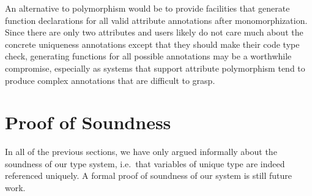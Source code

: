 An alternative to polymorphism would be to provide facilities that generate function declarations for all valid attribute annotations after monomorphization. Since there are only two attributes and users likely do not care much about the concrete uniqueness annotations except that they should make their code type check, generating functions for all possible annotations may be a worthwhile compromise, especially as systems that support attribute polymorphism tend to produce complex annotations that are difficult to grasp.

\section{Proof of Soundness}
In all of the previous sections, we have only argued informally about the soundness of our type system, i.e.\ that variables of unique type are indeed referenced uniquely. A formal proof of soundness of our system is still future work.